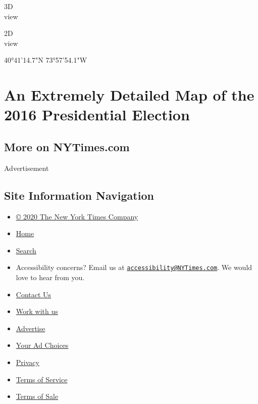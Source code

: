 3D\\
view

2D\\
view

40°41'14.7"N 73°57'54.1"W

\hypertarget{an-extremely-detailed-map-of-the-2016-presidential-election-1}{%
\section{An Extremely Detailed Map of the 2016 Presidential
Election}\label{an-extremely-detailed-map-of-the-2016-presidential-election-1}}

\hypertarget{more-on-nytimescom}{%
\subsection{More on NYTimes.com}\label{more-on-nytimescom}}

Advertisement

\hypertarget{site-information-navigation}{%
\subsection{Site Information
Navigation}\label{site-information-navigation}}

\begin{itemize}
\tightlist
\item
  \href{https://help.nytimes3xbfgragh.onion/hc/en-us/articles/115014792127-Copyright-notice}{©
  2020 The New York Times Company}
\item
  \href{https://www.nytimes3xbfgragh.onion}{Home}
\item
  \href{https://www.nytimes3xbfgragh.onion/search/}{Search}
\item
  Accessibility concerns? Email us at
  \href{mailto:accessibility@NYTimes.com}{\nolinkurl{accessibility@NYTimes.com}}.
  We would love to hear from you.
\item
  \href{https://help.nytimes3xbfgragh.onion/hc/en-us/articles/115015385887-Contact-Us}{Contact
  Us}
\item
  \href{https://www.nytco.com/careers/}{Work with us}
\item
  \href{https://nytmediakit.com/}{Advertise}
\item
  \href{https://help.nytimes3xbfgragh.onion/hc/en-us/articles/115014892108-Privacy-policy\#pp}{Your
  Ad Choices}
\item
  \href{https://help.nytimes3xbfgragh.onion/hc/en-us/articles/115014892108-Privacy-policy}{Privacy}
\item
  \href{https://help.nytimes3xbfgragh.onion/hc/en-us/articles/115014893428-Terms-of-service}{Terms
  of Service}
\item
  \href{https://help.nytimes3xbfgragh.onion/hc/en-us/articles/115014893968-Terms-of-sale}{Terms
  of Sale}
\end{itemize}

